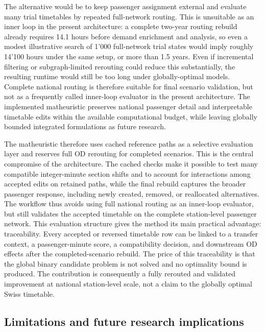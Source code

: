 \documentclass[preprint,12pt]{elsarticle}
\begin{document}
The alternative would be to keep passenger assignment external and evaluate many trial timetables by repeated full-network routing. This is unsuitable as an inner loop in the present architecture: a complete two-year routing rebuild already requires 14.1 hours before demand enrichment and analysis, so even a modest illustrative search of 1’000 full-network trial states would imply roughly 14’100 hours under the same setup, or more than 1.5 years. Even if incremental filtering or subgraph-limited rerouting could reduce this substantially, the resulting runtime would still be too long under globally-optimal models. Complete national routing is therefore suitable for final scenario validation, but not as a frequently called inner-loop evaluator in the present architecture. The implemented matheuristic preserves national passenger detail and interpretable timetable edits within the available computational budget, while leaving globally bounded integrated formulations as future research.

The matheuristic therefore uses cached reference paths as a selective evaluation layer and reserves full OD rerouting for completed scenarios. This is the central compromise of the architecture. The cached checks make it possible to test many compatible integer-minute section shifts and to account for interactions among accepted edits on retained paths, while the final rebuild captures the broader passenger response, including newly created, removed, or reallocated alternatives. The workflow thus avoids using full national routing as an inner-loop evaluator, but still validates the accepted timetable on the complete station-level passenger network. This evaluation structure gives the method its main practical advantage: traceability. Every accepted or reversed timetable row can be linked to a transfer context, a passenger-minute score, a compatibility decision, and downstream OD effects after the completed-scenario rebuild. The price of this traceability is that the global binary candidate problem is not solved and no optimality bound is produced. The contribution is consequently a fully rerouted and validated improvement at national station-level scale, not a claim to the globally optimal Swiss timetable.

\newpage
\subsection{Limitations and future research implications}\label{sec:discussion-part2-limitations}
\end{document}
